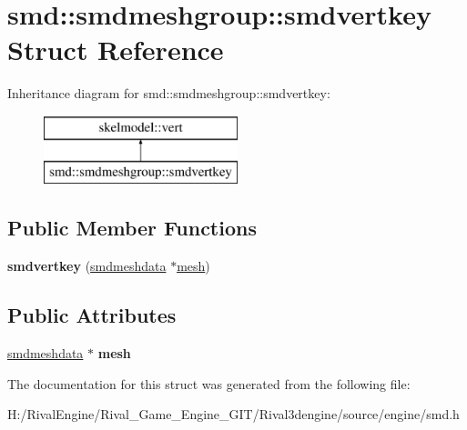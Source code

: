 \hypertarget{structsmd_1_1smdmeshgroup_1_1smdvertkey}{}\section{smd\+:\+:smdmeshgroup\+:\+:smdvertkey Struct Reference}
\label{structsmd_1_1smdmeshgroup_1_1smdvertkey}
Inheritance diagram for smd\+:\+:smdmeshgroup\+:\+:smdvertkey\+:\begin{figure}[H]
\begin{center}
\leavevmode
\includegraphics[height=2.000000cm]{structsmd_1_1smdmeshgroup_1_1smdvertkey}
\end{center}
\end{figure}
\subsection*{Public Member Functions}
\begin{DoxyCompactItemize}
\item 
\mbox{\label{structsmd_1_1smdmeshgroup_1_1smdvertkey_a479318659fe022beb26dd2cb6063f918}} 
{\bfseries smdvertkey} (\hyperlink{structsmd_1_1smdmeshgroup_1_1smdmeshdata}{smdmeshdata} $\ast$\hyperlink{structanimmodel_1_1mesh}{mesh})
\end{DoxyCompactItemize}
\subsection*{Public Attributes}
\begin{DoxyCompactItemize}
\item 
\mbox{\label{structsmd_1_1smdmeshgroup_1_1smdvertkey_a691f6ce79eeb673b4001cb823623f128}} 
\hyperlink{structsmd_1_1smdmeshgroup_1_1smdmeshdata}{smdmeshdata} $\ast$ {\bfseries mesh}
\end{DoxyCompactItemize}


The documentation for this struct was generated from the following file\+:\begin{DoxyCompactItemize}
\item 
H\+:/\+Rival\+Engine/\+Rival\+\_\+\+Game\+\_\+\+Engine\+\_\+\+G\+I\+T/\+Rival3dengine/source/engine/smd.\+h\end{DoxyCompactItemize}
